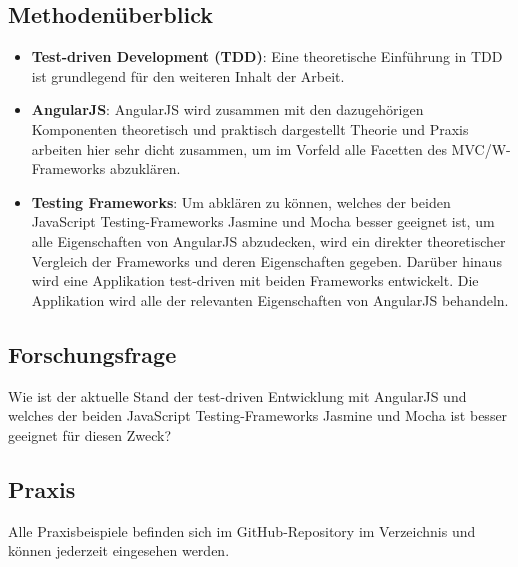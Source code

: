 \subsection{Methodenüberblick}
\begin{itemize}
  \item \textbf{Test-driven Development (TDD)}: Eine theoretische Einführung in TDD ist grundlegend für den weiteren Inhalt der Arbeit.
  \item \textbf{AngularJS}: AngularJS wird zusammen mit den dazugehörigen Komponenten theoretisch und praktisch dargestellt Theorie und Praxis arbeiten hier sehr dicht zusammen, um im Vorfeld alle Facetten des MVC/W-Frameworks abzuklären.
  \item \textbf{Testing Frameworks}: Um abklären zu können, welches der beiden JavaScript Testing-Frameworks {\glqq Jasmine\grqq} und {\glqq Mocha\grqq} besser geeignet ist, um alle Eigenschaften von AngularJS abzudecken, wird ein direkter theoretischer Vergleich der Frameworks und deren Eigenschaften gegeben. Darüber hinaus wird eine Applikation test-driven mit beiden Frameworks entwickelt. Die Applikation wird alle der relevanten Eigenschaften von AngularJS behandeln.
\end{itemize}

\subsection{Forschungsfrage}
Wie ist der aktuelle Stand der test-driven Entwicklung mit AngularJS und welches der beiden JavaScript Testing-Frameworks {\glqq Jasmine\grqq} und {\glqq Mocha\grqq} ist besser geeignet für diesen Zweck?

\subsection{Praxis}
Alle Praxisbeispiele befinden sich im GitHub-Repository  im Verzeichnis  und können jederzeit eingesehen werden.

